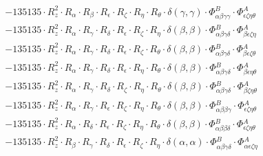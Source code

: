 \documentclass{article}
\begin{document}
\begin{subequations}
\begin{gather}
\begin{array}{c}
 \\[0.2em] 		 - 135135 \cdot R_{z}^{2} \cdot R_{\alpha{}} \cdot R_{\beta{}} \cdot R_{\epsilon{}} \cdot R_{\zeta{}} \cdot R_{\eta{}} \cdot R_{\theta{}} \cdot \delta{}\left(\gamma{}, \gamma{}\right) \cdot \Phi{}^{B}_{\alpha{}\beta{}\gamma{}\gamma{}} \cdot \Phi{}^{A}_{\epsilon{}\zeta{}\eta{}\theta{}} 
 \\[0.2em] 		 - 135135 \cdot R_{z}^{2} \cdot R_{\alpha{}} \cdot R_{\gamma{}} \cdot R_{\delta{}} \cdot R_{\epsilon{}} \cdot R_{\zeta{}} \cdot R_{\eta{}} \cdot \delta{}\left(\beta{}, \beta{}\right) \cdot \Phi{}^{B}_{\alpha{}\beta{}\gamma{}\delta{}} \cdot \Phi{}^{A}_{\beta{}\epsilon{}\zeta{}\eta{}} 
 \\[0.2em] 		 - 135135 \cdot R_{z}^{2} \cdot R_{\alpha{}} \cdot R_{\gamma{}} \cdot R_{\delta{}} \cdot R_{\epsilon{}} \cdot R_{\zeta{}} \cdot R_{\theta{}} \cdot \delta{}\left(\beta{}, \beta{}\right) \cdot \Phi{}^{B}_{\alpha{}\beta{}\gamma{}\delta{}} \cdot \Phi{}^{A}_{\beta{}\epsilon{}\zeta{}\theta{}} 
 \\[0.2em] 		 - 135135 \cdot R_{z}^{2} \cdot R_{\alpha{}} \cdot R_{\gamma{}} \cdot R_{\delta{}} \cdot R_{\epsilon{}} \cdot R_{\eta{}} \cdot R_{\theta{}} \cdot \delta{}\left(\beta{}, \beta{}\right) \cdot \Phi{}^{B}_{\alpha{}\beta{}\gamma{}\delta{}} \cdot \Phi{}^{A}_{\beta{}\epsilon{}\eta{}\theta{}} 
 \\[0.2em] 		 - 135135 \cdot R_{z}^{2} \cdot R_{\alpha{}} \cdot R_{\gamma{}} \cdot R_{\delta{}} \cdot R_{\zeta{}} \cdot R_{\eta{}} \cdot R_{\theta{}} \cdot \delta{}\left(\beta{}, \beta{}\right) \cdot \Phi{}^{B}_{\alpha{}\beta{}\gamma{}\delta{}} \cdot \Phi{}^{A}_{\beta{}\zeta{}\eta{}\theta{}} 
 \\[0.2em] 		 - 135135 \cdot R_{z}^{2} \cdot R_{\alpha{}} \cdot R_{\gamma{}} \cdot R_{\epsilon{}} \cdot R_{\zeta{}} \cdot R_{\eta{}} \cdot R_{\theta{}} \cdot \delta{}\left(\beta{}, \beta{}\right) \cdot \Phi{}^{B}_{\alpha{}\beta{}\beta{}\gamma{}} \cdot \Phi{}^{A}_{\epsilon{}\zeta{}\eta{}\theta{}} 
 \\[0.2em] 		 - 135135 \cdot R_{z}^{2} \cdot R_{\alpha{}} \cdot R_{\delta{}} \cdot R_{\epsilon{}} \cdot R_{\zeta{}} \cdot R_{\eta{}} \cdot R_{\theta{}} \cdot \delta{}\left(\beta{}, \beta{}\right) \cdot \Phi{}^{B}_{\alpha{}\beta{}\beta{}\delta{}} \cdot \Phi{}^{A}_{\epsilon{}\zeta{}\eta{}\theta{}} 
 \\[0.2em] 		 - 135135 \cdot R_{z}^{2} \cdot R_{\beta{}} \cdot R_{\gamma{}} \cdot R_{\delta{}} \cdot R_{\epsilon{}} \cdot R_{\zeta{}} \cdot R_{\eta{}} \cdot \delta{}\left(\alpha{}, \alpha{}\right) \cdot \Phi{}^{B}_{\alpha{}\beta{}\gamma{}\delta{}} \cdot \Phi{}^{A}_{\alpha{}\epsilon{}\zeta{}\eta{}} 

\end{array}
\end{gather}
\end{subequations}
\end{document}
